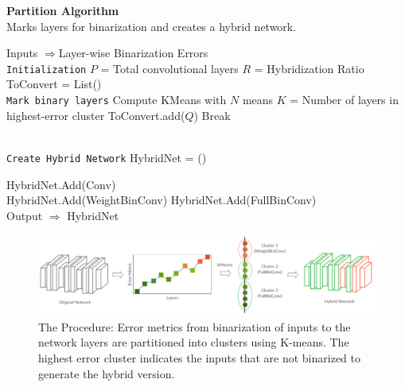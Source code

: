 \begin{algorithm}[t]
\centering
\caption{{\bf Partition Algorithm} \\Marks layers for binarization and creates a hybrid network.}
\begin{algorithmic}[1]
\State Inputs $\Rightarrow$Layer-wise Binarization Errors
\\

\State \texttt{Initialization}
\State $P$ = Total convolutional layers
\State $R$ = Hybridization Ratio
\State ToConvert = List() \\
\State \texttt{Mark binary layers}
	\State Compute KMeans with $N$ means
	\State $K$ = Number of layers in highest-error cluster
        	\State ToConvert.add($Q$) 
    \EndFor
    \State Break
	\EndIf
\EndFor 

\\

\State \texttt{Create Hybrid Network}
\State HybridNet = ()

\State HybridNet.Add(Conv)
\\
            \State HybridNet.Add(WeightBinConv)
        \Else
        	\State HybridNet.Add(FullBinConv)
        \EndIf
\EndFor
\\
\State Output $\Rightarrow$ HybridNet

\end{algorithmic}
\label{alg:partitionalgo}
\end{algorithm}
\begin{figure}[t]
\centering
\includegraphics[width=1.0\textwidth]{figures/Main-Algo-Diagram.png}
\caption{The Procedure: Error metrics from binarization of inputs to the network layers are partitioned into clusters using K-means. The highest error cluster indicates the inputs that are not binarized to generate the hybrid version.}
\label{fig:pipeline}
\end{figure}
